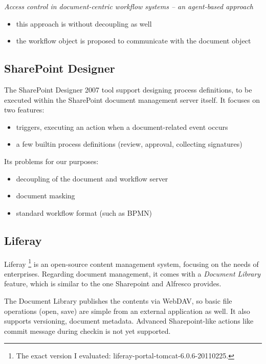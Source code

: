 \emph{Access control in document-centric workflow systems -- an agent-based approach} \cite{paper-access}
\begin{itemize}
\item this approach is without decoupling as well
\item the workflow object is proposed to communicate with the document object
\end{itemize}

\subsection*{SharePoint Designer}

The SharePoint Designer \cite{sp-designer} 2007 tool support designing process definitions, to
be executed within the SharePoint document management server itself. It focuses on two features:

\begin{itemize}
\item triggers, executing an action when a document-related event occurs
\item a few builtin process definitions (review, approval, collecting signatures)
\end{itemize}

Its problems for our purposes:

\begin{itemize}
\item decoupling of the document and workflow server
\item document masking
\item standard workflow format (such as BPMN)
\end{itemize}

\subsection*{Liferay}

Liferay \cite{liferay}\footnote{The exact version I evaluated:
liferay-portal-tomcat-6.0.6-20110225.} is an open-source content management
system, focusing on the needs of enterprises. Regarding document management, it
comes with a \emph{Document Library} feature, which is similar to the one
Sharepoint and Alfresco provides.

The Document Library publishes the contents via WebDAV, so basic file
operations (open, save) are simple from an external application as well. It
also supports versioning, document metadata. Advanced Sharepoint-like actions
like commit message during checkin is not yet supported.

